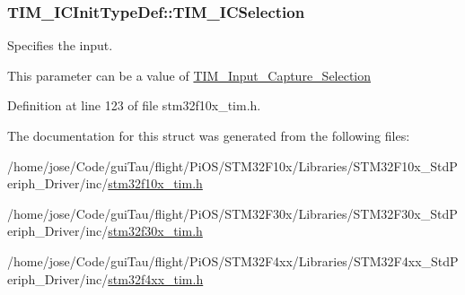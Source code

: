 \hypertarget{struct_t_i_m___i_c_init_type_def_a00b9a72e895a43dc18c69c96a149f080}{
\subsubsection[{T\-I\-M\-\_\-\-I\-C\-Selection}]{ T\-I\-M\-\_\-\-I\-C\-Init\-Type\-Def\-::\-T\-I\-M\-\_\-\-I\-C\-Selection}}\label{struct_t_i_m___i_c_init_type_def_a00b9a72e895a43dc18c69c96a149f080}
\begin{DoxyVerb}  Specifies the input.
\end{DoxyVerb}
 This parameter can be a value of \hyperlink{group___t_i_m___input___capture___selection}{T\-I\-M\-\_\-\-Input\-\_\-\-Capture\-\_\-\-Selection} 

Definition at line 123 of file stm32f10x\-\_\-tim.\-h.



The documentation for this struct was generated from the following files\-:\begin{DoxyCompactItemize}
\item 
/home/jose/\-Code/gui\-Tau/flight/\-Pi\-O\-S/\-S\-T\-M32\-F10x/\-Libraries/\-S\-T\-M32\-F10x\-\_\-\-Std\-Periph\-\_\-\-Driver/inc/\hyperlink{stm32f10x__tim_8h}{stm32f10x\-\_\-tim.\-h}\item 
/home/jose/\-Code/gui\-Tau/flight/\-Pi\-O\-S/\-S\-T\-M32\-F30x/\-Libraries/\-S\-T\-M32\-F30x\-\_\-\-Std\-Periph\-\_\-\-Driver/inc/\hyperlink{stm32f30x__tim_8h}{stm32f30x\-\_\-tim.\-h}\item 
/home/jose/\-Code/gui\-Tau/flight/\-Pi\-O\-S/\-S\-T\-M32\-F4xx/\-Libraries/\-S\-T\-M32\-F4xx\-\_\-\-Std\-Periph\-\_\-\-Driver/inc/\hyperlink{stm32f4xx__tim_8h}{stm32f4xx\-\_\-tim.\-h}\end{DoxyCompactItemize}
